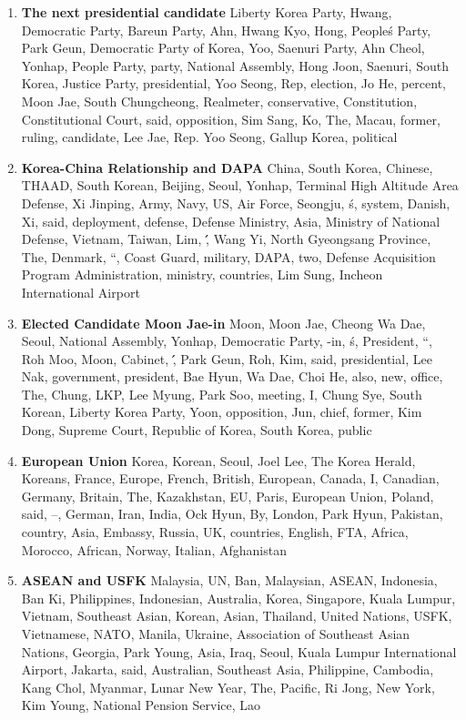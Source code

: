 \begin{enumerate}
  \item \textbf{The next presidential candidate} Liberty Korea Party, Hwang, Democratic Party, Bareun Party, Ahn, Hwang Kyo, Hong, People\'s Party, Park Geun, Democratic Party of Korea, Yoo, Saenuri Party, Ahn Cheol, Yonhap, People Party, party, National Assembly, Hong Joon, Saenuri, South Korea, Justice Party,  presidential, Yoo Seong, Rep, election, Jo He, percent, Moon Jae, South Chungcheong, Realmeter, conservative, Constitution, Constitutional Court, said, opposition, Sim Sang, Ko, The, Macau, former, ruling, candidate, Lee Jae, Rep. Yoo Seong, Gallup Korea, political
  \item \textbf{Korea-China Relationship and DAPA} China, South Korea, Chinese, THAAD, South Korean, Beijing, Seoul, Yonhap, Terminal High Altitude Area Defense, Xi Jinping, Army, Navy, US, Air Force, Seongju, \'s, system, Danish, Xi, said, deployment, defense, Defense Ministry, Asia, Ministry of National Defense, Vietnam, Taiwan, Lim, \'\', Wang Yi, North Gyeongsang Province, The, Denmark, ``, Coast Guard, military, DAPA, two, Defense Acquisition Program Administration, ministry, countries, Lim Sung, Incheon International Airport
  \item \textbf{Elected Candidate Moon Jae-in} Moon, Moon Jae, Cheong Wa Dae, Seoul, National Assembly, Yonhap, Democratic Party, -in, \'s, President, ``, Roh Moo, Moon, Cabinet, \'\', Park Geun, Roh, Kim, said, presidential, Lee Nak, government, president, Bae Hyun, Wa Dae, Choi He, also, new, office, The, Chung, LKP, Lee Myung, Park Soo, meeting,  I, Chung Sye, South Korean, Liberty Korea Party, Yoon, opposition, Jun, chief, former, Kim Dong, Supreme Court, Republic of Korea, South Korea, public
  \item \textbf{European Union} Korea, Korean, Seoul, Joel Lee, The Korea Herald, Koreans, France, Europe, French, British, European, Canada, I, Canadian, Germany, Britain, The, Kazakhstan, EU, Paris, European Union, Poland, said, --, German, Iran, India, Ock Hyun, By, London, Park Hyun, Pakistan, country, Asia, Embassy, Russia, UK, countries, English, FTA, Africa, Morocco, African, Norway, Italian, Afghanistan
  \item \textbf{ASEAN and USFK} Malaysia, UN, Ban, Malaysian, ASEAN, Indonesia, Ban Ki, Philippines, Indonesian, Australia, Korea, Singapore, Kuala Lumpur, Vietnam, Southeast Asian, Korean, Asian, Thailand, United Nations, USFK, Vietnamese, NATO, Manila, Ukraine, Association of Southeast Asian Nations, Georgia, Park Young, Asia, Iraq, Seoul, Kuala Lumpur International Airport, Jakarta, said, Australian, Southeast Asia, Philippine, Cambodia, Kang Chol, Myanmar, Lunar New Year, The, Pacific, Ri Jong, New York, Kim Young, National Pension Service, Lao
\end{enumerate}


